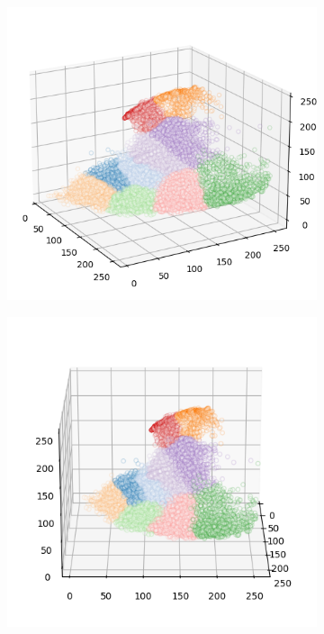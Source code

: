 \begin{figure}[htbp]
\begin{subfigure}[t]{0.32\textwidth}
    \end{subfigure}
    \begin{subfigure}[t]{0.32\textwidth}
        \includegraphics[width=\linewidth]{../../python_code/plots/kmeans/flower-23/clusters_elev20_azim-30.png}
    \end{subfigure}
    \begin{subfigure}[t]{0.32\textwidth}
        \includegraphics[width=\linewidth]{../../python_code/plots/kmeans/flower-23/clusters_elev20_azim0.png}

\end{subfigure}
\end{figure}
